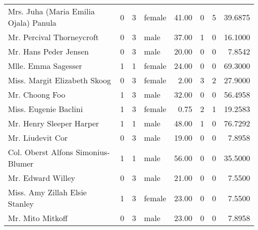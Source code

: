 \begin{tabular}{lrrlrrrr}
Mrs. Juha (Maria Emilia Ojala) Panula              &         0 &       3 &  female &  41.00 &                        0 &                        5 &   39.6875 \\
Mr. Percival Thorneycroft                          &         0 &       3 &    male &  37.00 &                        1 &                        0 &   16.1000 \\
Mr. Hans Peder Jensen                              &         0 &       3 &    male &  20.00 &                        0 &                        0 &    7.8542 \\
Mlle. Emma Sagesser                                &         1 &       1 &  female &  24.00 &                        0 &                        0 &   69.3000 \\
Miss. Margit Elizabeth Skoog                       &         0 &       3 &  female &   2.00 &                        3 &                        2 &   27.9000 \\
Mr. Choong Foo                                     &         1 &       3 &    male &  32.00 &                        0 &                        0 &   56.4958 \\
Miss. Eugenie Baclini                              &         1 &       3 &  female &   0.75 &                        2 &                        1 &   19.2583 \\
Mr. Henry Sleeper Harper                           &         1 &       1 &    male &  48.00 &                        1 &                        0 &   76.7292 \\
Mr. Liudevit Cor                                   &         0 &       3 &    male &  19.00 &                        0 &                        0 &    7.8958 \\
Col. Oberst Alfons Simonius-Blumer                 &         1 &       1 &    male &  56.00 &                        0 &                        0 &   35.5000 \\
Mr. Edward Willey                                  &         0 &       3 &    male &  21.00 &                        0 &                        0 &    7.5500 \\
Miss. Amy Zillah Elsie Stanley                     &         1 &       3 &  female &  23.00 &                        0 &                        0 &    7.5500 \\
Mr. Mito Mitkoff                                   &         0 &       3 &    male &  23.00 &                        0 &                        0 &    7.8958 \\

\end{tabular}
